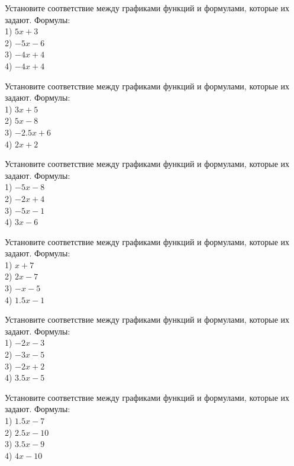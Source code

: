\documentclass[4apaper]{article}
\begin{document}
\begin{taskBN}{7}
Установите соответствие между графиками функций и формулами, которые их задают. Формулы: \\1) $5x+3$\\2) $-5x-6$\\3) $-4x+4$\\4) $-4x+4$
\end{taskBN}

\begin{taskBN}{8}
Установите соответствие между графиками функций и формулами, которые их задают. Формулы: \\1) $3x+5$\\2) $5x-8$\\3) $-2.5x+6$\\4) $2x+2$
\end{taskBN}

\begin{taskBN}{9}
Установите соответствие между графиками функций и формулами, которые их задают. Формулы: \\1) $-5x-8$\\2) $-2x+4$\\3) $-5x-1$\\4) $3x-6$
\end{taskBN}

\begin{taskBN}{10}
Установите соответствие между графиками функций и формулами, которые их задают. Формулы: \\1) $x+7$\\2) $2x-7$\\3) $-x-5$\\4) $1.5x-1$
\end{taskBN}

\begin{taskBN}{11}
Установите соответствие между графиками функций и формулами, которые их задают. Формулы: \\1) $-2x-3$\\2) $-3x-5$\\3) $-2x+2$\\4) $3.5x-5$
\end{taskBN}

\begin{taskBN}{12}
Установите соответствие между графиками функций и формулами, которые их задают. Формулы: \\1) $1.5x-7$\\2) $2.5x-10$\\3) $3.5x-9$\\4) $4x-10$
\end{taskBN}
\end{document}
